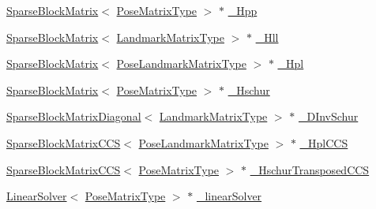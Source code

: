 \begin{DoxyCompactItemize}
\item 
\mbox{\hyperlink{classg2o_1_1_sparse_block_matrix}{Sparse\+Block\+Matrix}}$<$ \mbox{\hyperlink{classg2o_1_1_block_solver_a8c7c43d361bd31e3e0353889ba703bc0}{Pose\+Matrix\+Type}} $>$ $\ast$ \mbox{\hyperlink{classg2o_1_1_block_solver_ac222d4342825ed8632a87b4f5be94618}{\+\_\+\+Hpp}}
\item 
\mbox{\hyperlink{classg2o_1_1_sparse_block_matrix}{Sparse\+Block\+Matrix}}$<$ \mbox{\hyperlink{classg2o_1_1_block_solver_afd898a666343291129d37a979e23ded6}{Landmark\+Matrix\+Type}} $>$ $\ast$ \mbox{\hyperlink{classg2o_1_1_block_solver_a88d4c24df24a8fb72be1a4e4cff03d71}{\+\_\+\+Hll}}
\item 
\mbox{\hyperlink{classg2o_1_1_sparse_block_matrix}{Sparse\+Block\+Matrix}}$<$ \mbox{\hyperlink{classg2o_1_1_block_solver_a96bf60b923f816086cd2f24de38736ec}{Pose\+Landmark\+Matrix\+Type}} $>$ $\ast$ \mbox{\hyperlink{classg2o_1_1_block_solver_a0f6051339990e95aa587145a8a6f4f5f}{\+\_\+\+Hpl}}
\item 
\mbox{\hyperlink{classg2o_1_1_sparse_block_matrix}{Sparse\+Block\+Matrix}}$<$ \mbox{\hyperlink{classg2o_1_1_block_solver_a8c7c43d361bd31e3e0353889ba703bc0}{Pose\+Matrix\+Type}} $>$ $\ast$ \mbox{\hyperlink{classg2o_1_1_block_solver_a46977934a3e4fb0cd36bc4181ed3ec0e}{\+\_\+\+Hschur}}
\item 
\mbox{\hyperlink{classg2o_1_1_sparse_block_matrix_diagonal}{Sparse\+Block\+Matrix\+Diagonal}}$<$ \mbox{\hyperlink{classg2o_1_1_block_solver_afd898a666343291129d37a979e23ded6}{Landmark\+Matrix\+Type}} $>$ $\ast$ \mbox{\hyperlink{classg2o_1_1_block_solver_ad6a1a8f17c8fb854962a8204c79bc981}{\+\_\+\+D\+Inv\+Schur}}
\item 
\mbox{\hyperlink{classg2o_1_1_sparse_block_matrix_c_c_s}{Sparse\+Block\+Matrix\+C\+CS}}$<$ \mbox{\hyperlink{classg2o_1_1_block_solver_a96bf60b923f816086cd2f24de38736ec}{Pose\+Landmark\+Matrix\+Type}} $>$ $\ast$ \mbox{\hyperlink{classg2o_1_1_block_solver_ab54eb7bb13f8b3a8a5f135a98f2050ec}{\+\_\+\+Hpl\+C\+CS}}
\item 
\mbox{\hyperlink{classg2o_1_1_sparse_block_matrix_c_c_s}{Sparse\+Block\+Matrix\+C\+CS}}$<$ \mbox{\hyperlink{classg2o_1_1_block_solver_a8c7c43d361bd31e3e0353889ba703bc0}{Pose\+Matrix\+Type}} $>$ $\ast$ \mbox{\hyperlink{classg2o_1_1_block_solver_acea4b8ea8db5a29b63bea4bc568b0b26}{\+\_\+\+Hschur\+Transposed\+C\+CS}}
\item 
\mbox{\hyperlink{classg2o_1_1_linear_solver}{Linear\+Solver}}$<$ \mbox{\hyperlink{classg2o_1_1_block_solver_a8c7c43d361bd31e3e0353889ba703bc0}{Pose\+Matrix\+Type}} $>$ $\ast$ \mbox{\hyperlink{classg2o_1_1_block_solver_a676a4ef473ccaecb23050284e19659af}{\+\_\+linear\+Solver}}

\end{DoxyCompactItemize}
